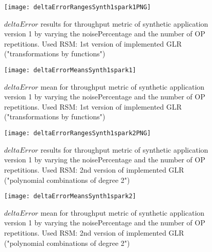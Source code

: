 \begin{figure}[htb]

    \centering
    
    \texttt{[image: deltaErrorRangesSynth1spark1PNG]}
    
     \caption{$deltaError$ results for throughput metric of synthetic application version 1 by varying the noisePercentage and the number of OP repetitions. Used RSM: 1st version of implemented GLR ("transformations by functions")}
    
    \label{fig::synth1spark1::intervals}
    
\end{figure}

\begin{figure}[htb]

    \centering
    
    \texttt{[image: deltaErrorMeansSynth1spark1]}
    
    \caption{$deltaError$ mean for throughput metric of synthetic application version 1 by varying the noisePercentage and the number of OP repetitions. Used RSM: 1st version of implemented GLR ("transformations by functions")}
    
    \label{fig::synth1spark1::means}
    
\end{figure}





\begin{figure}[htb]

    \centering
    
    \texttt{[image: deltaErrorRangesSynth1spark2PNG]}
    
     \caption{$deltaError$ results for throughput metric of synthetic application version 1 by varying the noisePercentage and the number of OP repetitions. Used RSM: 2nd version of implemented GLR ("polynomial combinations of degree 2")}
    
    \label{fig::synth1spark2::intervals}
    
\end{figure}

\begin{figure}[htb]

    \centering
    
    \texttt{[image: deltaErrorMeansSynth1spark2]}
    
    \caption{$deltaError$ mean for throughput metric of synthetic application version 1 by varying the noisePercentage and the number of OP repetitions. Used RSM: 2nd version of implemented GLR ("polynomial combinations of degree 2")}
    
    \label{fig::synth1spark2::means}
    
\end{figure}





